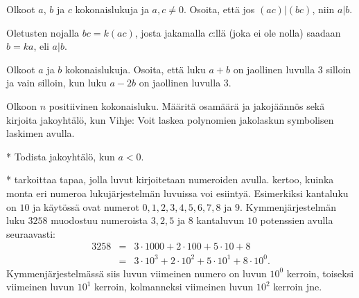 \begin{kotitehtavasivu}
\begin{tehtava}
	Olkoot $a$, $b$ ja $c$ kokonaislukuja ja $a, c \neq 0$. Osoita, että jos $(ac)|(bc)$, niin $a|b$.
	\begin{vastaus}
	Oletusten nojalla $bc = k(ac)$, josta jakamalla $c$:llä (joka ei ole nolla) saadaan $b = ka$, eli $a | b$.
	\end{vastaus}
\end{tehtava}

\begin{tehtava}
	Olkoot $a$ ja $b$ kokonaislukuja. Osoita, että luku $a + b$ on jaollinen luvulla $3$ silloin ja vain silloin, kun luku $a - 2b$ on jaollinen luvulla $3$.
\end{tehtava}

\begin{tehtava}
	Olkoon $n$ positiivinen kokonaisluku. Määritä osamäärä ja jakojäännös sekä kirjoita jakoyhtälö, kun
	Vihje: Voit laskea polynomien jakolaskun symbolisen laskimen avulla.
	\begin{vastaus}
	\end{vastaus}
\end{tehtava}

\begin{tehtava}
	* Todista jakoyhtälö, kun $a<0$.
\end{tehtava}

\begin{tehtava}
	*  tarkoittaa tapaa, jolla luvut kirjoitetaan numeroiden avulla.  kertoo, kuinka monta eri numeroa lukujärjestelmän luvuissa voi esiintyä. Esimerkiksi  kantaluku on $10$ ja käytössä ovat numerot $0, 1, 2, 3, 4, 5, 6, 7, 8$ ja $9$. Kymmenjärjestelmän luku $3258$ muodostuu numeroista $3, 2, 5$ ja $8$ kantaluvun $10$ potenssien avulla seuraavasti:
	\begin{eqnarray*}
	3258 &=&3\cdot 1000+2\cdot 100+5\cdot 10+8\\
	&=& 3\cdot 10^3+2\cdot 10^2+5\cdot 10^1+8\cdot 10^0.
	\end{eqnarray*}
	Kymmenjärjestelmässä siis luvun viimeinen numero on luvun $10^0$ kerroin, toiseksi viimeinen luvun $10^1$ kerroin, kolmanneksi viimeinen luvun $10^2$ kerroin jne.


\end{tehtava}
\end{kotitehtavasivu}
